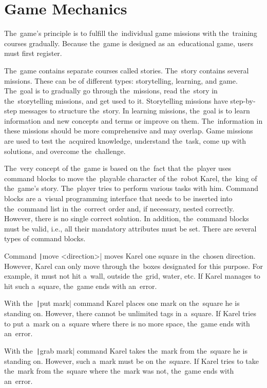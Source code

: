 \section{Game Mechanics}

The~game's principle is to fulfill the~individual game missions with the~training courses gradually.
Because the~game is designed as an~educational game, users must first register.

The~game contains separate courses called stories.
The~story contains several missions.
These can be of different types: storytelling, learning, and game.
The~goal is to gradually go through the~missions, read the~story in the~storytelling missions, and get used to it.
Storytelling missions have step-by-step messages to structure the~story.
In learning missions, the~goal is to learn information and new concepts and terms or improve on them.
The~information in these missions should be more comprehensive and may overlap.
Game missions are used to test the~acquired knowledge, understand the~task, come up with solutions, and overcome the~challenge.

The~very concept of the~game is based on the~fact that the~player uses command blocks to move the~playable character of the~robot Karel, the~king of the~game's story.
The~player tries to perform various tasks with him.
Command blocks are a~visual programming interface that needs to be inserted into the~command list in the~correct order and, if necessary, nested correctly.
However, there is no single correct solution.
In addition, the~command blocks must be valid, i.e., all their mandatory attributes must be set.
There are several types of command blocks.

Command \texttt|move <direction>| moves Karel one square in the~chosen direction.
However, Karel can only move through the~boxes designated for this purpose.
For example, it must not hit a~wall, outside the~grid, water, etc.
If Karel manages to hit such a~square, the~game ends with an~error.

With the~\texttt|put mark| command Karel places one mark on the~square he is standing on.
However, there cannot be unlimited tags in a~square.
If Karel tries to put a~mark on a~square where there is no more space, the~game ends with an~error.

With the~\texttt|grab mark| command Karel takes the~mark from the~square he is standing on.
However, such a~mark must be on the~square.
If Karel tries to take the~mark from the~square where the~mark was not, the~game ends with an~error.


